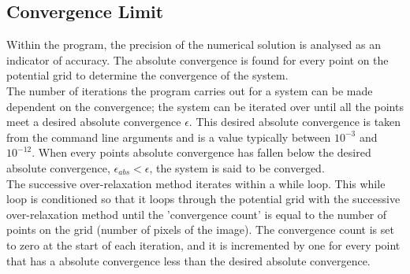 \subsection{Convergence Limit}
Within the program, the precision of the numerical solution is analysed as an indicator of accuracy. The absolute convergence is found for every point on the potential grid to determine the convergence of the system.
\\
The number of iterations the program carries out for a system can be made dependent on the convergence; the system can be iterated over until all the points meet a desired absolute convergence $\epsilon$. This desired absolute convergence is taken from the command line arguments and is a value typically between $10^{-3}$ and $10^{-12}$. When every points absolute convergence has fallen below the desired absolute convergence, $\epsilon_{abs} < \epsilon$, the system is said to be converged. 
\\
The successive over-relaxation method iterates within a while loop. This while loop is conditioned so that it loops through the potential grid with the successive over-relaxation method until the 'convergence count' is equal to the number of points on the grid (number of pixels of the image). The convergence count is set to zero at the start of each iteration, and it is incremented by one for every point that has a absolute convergence less than the desired absolute convergence.
